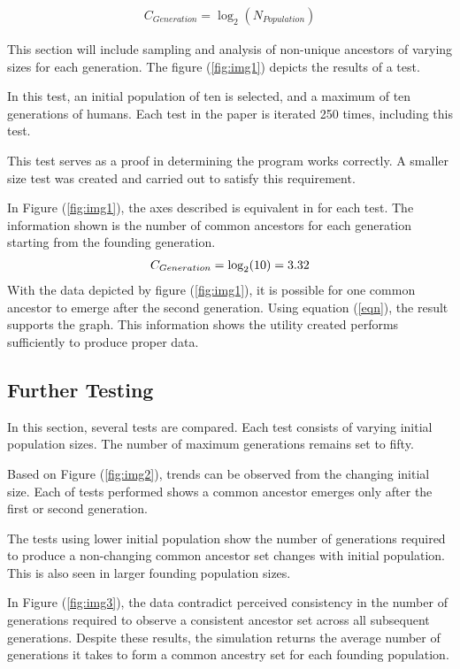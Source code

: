 \documentclass[12pt]{extarticle}
\begin{document}
\begin{align}
\label{eqn}
C_{Generation} = \log_2 (N_{Population})
\end{align}
 
This section will include sampling and analysis of non-unique ancestors of varying sizes for each generation. The figure (\ref{fig:img1}) depicts the results of a test. 

In this test, an initial population of ten is selected, and a maximum of ten generations of humans. Each test in the paper is iterated 250 times, including this test.

This test serves as a proof in determining the program works correctly. A smaller size test was created and carried out to satisfy this requirement.

In Figure (\ref{fig:img1}), the axes described is equivalent in for each test. The information shown is the number of common ancestors for each generation starting from the founding generation.
\begin{align}
\notag
C_{Generation} = \log_2(10) = 3.32
\end{align}
\indent With the data depicted by figure (\ref{fig:img1}), it is possible for one common ancestor to emerge after the second generation. Using equation (\ref{eqn}), the result supports the graph. This information shows the utility created performs sufficiently to produce proper data.


\subsection{Further Testing}

In this section, several tests are compared. Each test consists of varying initial population sizes. The number of maximum generations remains set to fifty.

Based on Figure (\ref{fig:img2}), trends can be observed from the changing initial size. Each of tests performed shows a common ancestor emerges only after the first or second generation.

The tests using lower initial population show the number of generations required to produce a non-changing common ancestor set changes with initial population. This is also seen in larger founding population sizes.

In Figure (\ref{fig:img3}), the data contradict perceived consistency in the number of generations required to observe a consistent ancestor set across all subsequent generations. Despite these results, the simulation returns the average number of generations it takes to form a common ancestry set for each founding population. 
\end{document}
